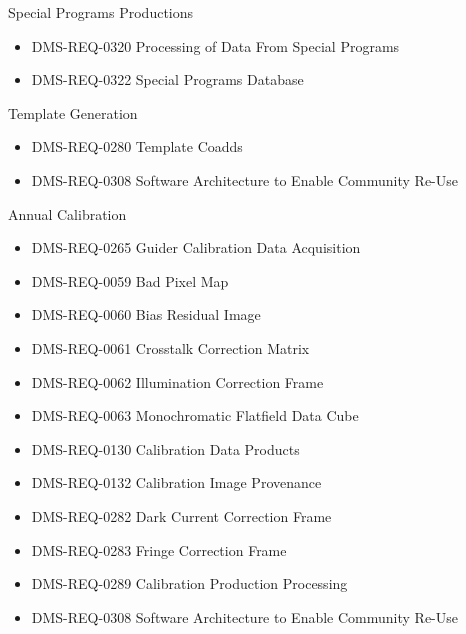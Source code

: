 Special Programs Productions \begin{itemize}
\item DMS-REQ-0320 Processing of Data From Special Programs
\item DMS-REQ-0322 Special Programs Database
\end{itemize}
Template Generation \begin{itemize}
\item DMS-REQ-0280 Template Coadds
\item DMS-REQ-0308 Software Architecture to Enable Community Re-Use
\end{itemize}
Annual Calibration \begin{itemize}
\item DMS-REQ-0265 Guider Calibration Data Acquisition
\item DMS-REQ-0059 Bad Pixel Map
\item DMS-REQ-0060 Bias Residual Image
\item DMS-REQ-0061 Crosstalk Correction Matrix
\item DMS-REQ-0062 Illumination Correction Frame
\item DMS-REQ-0063 Monochromatic Flatfield Data Cube
\item DMS-REQ-0130 Calibration Data Products
\item DMS-REQ-0132 Calibration Image Provenance
\item DMS-REQ-0282 Dark Current Correction Frame
\item DMS-REQ-0283 Fringe Correction Frame
\item DMS-REQ-0289 Calibration Production Processing
\item DMS-REQ-0308 Software Architecture to Enable Community Re-Use
\end{itemize}
